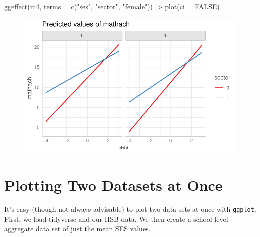 \documentclass[
  letterpaper,
  DIV=11,
  numbers=noendperiod]{scrreprt}
\newenvironment{Shaded}{\begin{snugshade}}{\end{snugshade}}
\newcommand{\AttributeTok}[1]{\textcolor[rgb]{0.49,0.56,0.16}{#1}}
\newcommand{\ConstantTok}[1]{\textcolor[rgb]{0.53,0.00,0.00}{#1}}
\newcommand{\FunctionTok}[1]{\textcolor[rgb]{0.02,0.16,0.49}{#1}}
\newcommand{\NormalTok}[1]{\textcolor[rgb]{0.00,0.44,0.13}{#1}}
\newcommand{\SpecialCharTok}[1]{\textcolor[rgb]{0.25,0.44,0.63}{#1}}
\newcommand{\StringTok}[1]{\textcolor[rgb]{0.25,0.44,0.63}{#1}}
\begin{document}
\begin{Shaded}
\begin{Highlighting}[]
\FunctionTok{ggeffect}\NormalTok{(m4, }\AttributeTok{terms =} \FunctionTok{c}\NormalTok{(}\StringTok{"ses"}\NormalTok{, }\StringTok{"sector"}\NormalTok{, }\StringTok{"female"}\NormalTok{)) }\SpecialCharTok{|\textgreater{}} 
  \FunctionTok{plot}\NormalTok{(}\AttributeTok{ci =} \ConstantTok{FALSE}\NormalTok{)}
\end{Highlighting}
\end{Shaded}

\begin{figure}[H]

{\centering \includegraphics{ggeffects_files/figure-pdf/unnamed-chunk-6-3.pdf}

}

\end{figure}

\hypertarget{plotting-two-datasets-at-once}{%
\chapter{Plotting Two Datasets at
Once}\label{plotting-two-datasets-at-once}}

It's easy (though not always advisable) to plot two data sets at once
with \texttt{ggplot}. First, we load tidyverse and our HSB data. We then
create a school-level aggregate data set of just the mean SES values.
\end{document}
